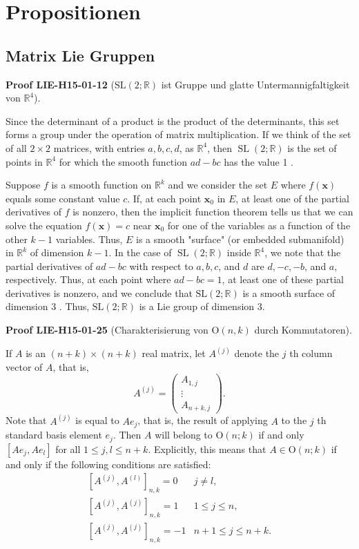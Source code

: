 \documentclass[10pt, letterpaper]{article}
\newcommand{\R}{\mathbb{R}}
\newcommand{\SL}{\mathrm{SL}}
\newcommand{\Ogroup}{\mathrm{O}} %
\newcommand{\CustomHeading}[3]{%
  \par\medskip\noindent%
  \textbf{#1 #2} \textnormal{(#3)}.\enskip%
}
\newenvironment{PROOF}[2]{\CustomHeading{Proof}{#1}{#2}}{}
\begin{document}
\section{Propositionen}

\subsection{Matrix Lie Gruppen}

\begin{PROOF}{LIE-H15-01-12}{$\SL(2 ; \mathbb{R})$ ist Gruppe und glatte Untermannigfaltigkeit von $\R^4$}
Since the determinant of a product is the product of the determinants, this set forms a group under the operation of matrix multiplication. If we think of the set of all $2 \times 2$ matrices, with entries $a, b, c, d$, as $\mathbb{R}^{4}$, then $\operatorname{SL}(2 ; \mathbb{R})$ is the set of points in $\mathbb{R}^{4}$ for which the smooth function $a d-b c$ has the value 1 .

Suppose $f$ is a smooth function on $\mathbb{R}^{k}$ and we consider the set $E$ where $f(\mathbf{x})$ equals some constant value $c$. If, at each point $\mathbf{x}_{0}$ in $E$, at least one of the partial derivatives of $f$ is nonzero, then the implicit function theorem tells us that we can solve the equation $f(\mathbf{x})=c$ near $\mathbf{x}_{0}$ for one of the variables as a function of the other $k-1$ variables. Thus, $E$ is a smooth "surface" (or embedded submanifold) in $\mathbb{R}^{k}$ of dimension $k-1$. In the case of $\operatorname{SL}(2 ; \mathbb{R})$ inside $\mathbb{R}^{4}$, we note that the partial derivatives of $a d-b c$ with respect to $a, b, c$, and $d$ are $d,-c,-b$, and $a$, respectively. Thus, at each point where $a d-b c=1$, at least one of these partial derivatives is nonzero, and we conclude that $\mathrm{SL}(2 ; \mathbb{R})$ is a smooth surface of dimension 3 . Thus, $\mathrm{SL}(2 ; \mathbb{R})$ is a Lie group of dimension 3.
\end{PROOF}

\begin{PROOF}{LIE-H15-01-25}{Charakterisierung von $\Ogroup(n,k)$ durch Kommutatoren}
If $A$ is an $(n+k) \times(n+k)$ real matrix, let $A^{(j)}$ denote the $j$ th column vector of $A$, that is,
$$
A^{(j)}=\left(\begin{array}{c}
A_{1, j} \\
\vdots \\
A_{n+k, j}
\end{array}\right) .
$$
Note that $A^{(j)}$ is equal to $A e_{j}$, that is, the result of applying $A$ to the $j$ th standard basis element $e_{j}$. Then $A$ will belong to $\mathrm{O}(n ; k)$ if and only $\left[A e_{j}, A e_{l}\right]$ for all $1 \leq j, l \leq n+k$. Explicitly, this means that $A \in \mathrm{O}(n ; k)$ if and only if the following conditions are satisfied:
$$
\begin{array}{ll}
{\left[A^{(j)}, A^{(l)}\right]_{n, k}=0} & j \neq l, \\
{\left[A^{(j)}, A^{(j)}\right]_{n, k}=1} & 1 \leq j \leq n, \\
{\left[A^{(j)}, A^{(j)}\right]_{n, k}=-1} & n+1 \leq j \leq n+k .
\end{array}
$$
\end{PROOF}
\end{document}
